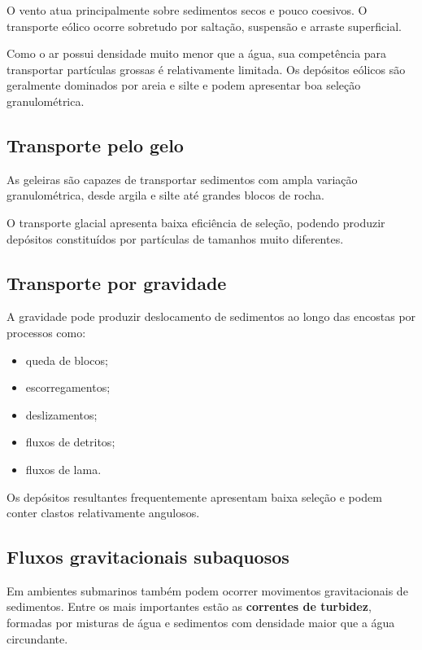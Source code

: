 \documentclass[a4paper,12pt]{article}
\theoremstyle{definition}
\theoremstyle{definition}
\theoremstyle{definition}
\begin{document}
O vento atua principalmente sobre sedimentos secos e pouco coesivos. O
transporte eólico ocorre sobretudo por saltação, suspensão e arraste superficial.

Como o ar possui densidade muito menor que a água, sua competência para
transportar partículas grossas é relativamente limitada. Os depósitos eólicos
são geralmente dominados por areia e silte e podem apresentar boa seleção
granulométrica.

\subsection{Transporte pelo gelo}

As geleiras são capazes de transportar sedimentos com ampla variação
granulométrica, desde argila e silte até grandes blocos de rocha.

O transporte glacial apresenta baixa eficiência de seleção, podendo produzir
depósitos constituídos por partículas de tamanhos muito diferentes.

\subsection{Transporte por gravidade}

A gravidade pode produzir deslocamento de sedimentos ao longo das encostas por
processos como:

\begin{itemize}
    \item queda de blocos;
    \item escorregamentos;
    \item deslizamentos;
    \item fluxos de detritos;
    \item fluxos de lama.
\end{itemize}

Os depósitos resultantes frequentemente apresentam baixa seleção e podem conter
clastos relativamente angulosos.

\subsection{Fluxos gravitacionais subaquosos}

Em ambientes submarinos também podem ocorrer movimentos gravitacionais de
sedimentos. Entre os mais importantes estão as \textbf{correntes de turbidez},
formadas por misturas de água e sedimentos com densidade maior que a água
circundante.
\end{document}
